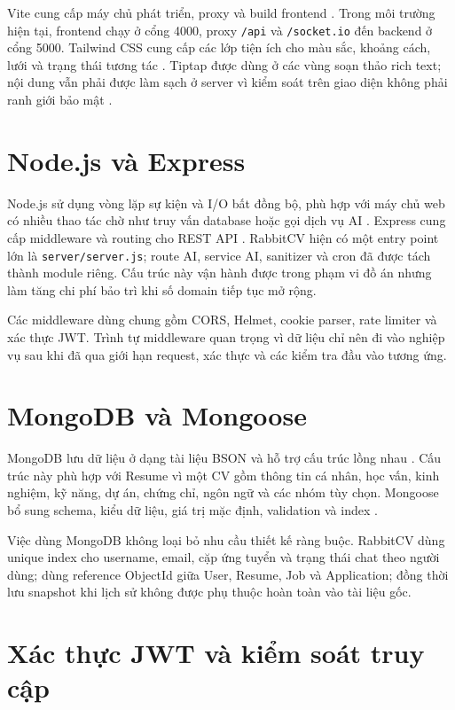 Vite cung cấp máy chủ phát triển, proxy và build frontend \cite{vitedocs}. Trong môi trường hiện tại, frontend chạy ở cổng 4000, proxy \texttt{/api} và \texttt{/socket.io} đến backend ở cổng 5000. Tailwind CSS cung cấp các lớp tiện ích cho màu sắc, khoảng cách, lưới và trạng thái tương tác \cite{tailwinddocs}. Tiptap được dùng ở các vùng soạn thảo rich text; nội dung vẫn phải được làm sạch ở server vì kiểm soát trên giao diện không phải ranh giới bảo mật \cite{tiptapdocs}.

\section{Node.js và Express}

Node.js sử dụng vòng lặp sự kiện và I/O bất đồng bộ, phù hợp với máy chủ web có nhiều thao tác chờ như truy vấn database hoặc gọi dịch vụ AI \cite{nodedocs}. Express cung cấp middleware và routing cho REST API \cite{expressdocs}. RabbitCV hiện có một entry point lớn là \texttt{server/server.js}; route AI, service AI, sanitizer và cron đã được tách thành module riêng. Cấu trúc này vận hành được trong phạm vi đồ án nhưng làm tăng chi phí bảo trì khi số domain tiếp tục mở rộng.

Các middleware dùng chung gồm CORS, Helmet, cookie parser, rate limiter và xác thực JWT. Trình tự middleware quan trọng vì dữ liệu chỉ nên đi vào nghiệp vụ sau khi đã qua giới hạn request, xác thực và các kiểm tra đầu vào tương ứng.

\section{MongoDB và Mongoose}

MongoDB lưu dữ liệu ở dạng tài liệu BSON và hỗ trợ cấu trúc lồng nhau \cite{mongodbdocs}. Cấu trúc này phù hợp với Resume vì một CV gồm thông tin cá nhân, học vấn, kinh nghiệm, kỹ năng, dự án, chứng chỉ, ngôn ngữ và các nhóm tùy chọn. Mongoose bổ sung schema, kiểu dữ liệu, giá trị mặc định, validation và index \cite{mongooseDocs}.

Việc dùng MongoDB không loại bỏ nhu cầu thiết kế ràng buộc. RabbitCV dùng unique index cho username, email, cặp ứng tuyển và trạng thái chat theo người dùng; dùng reference ObjectId giữa User, Resume, Job và Application; đồng thời lưu snapshot khi lịch sử không được phụ thuộc hoàn toàn vào tài liệu gốc.

\section{Xác thực JWT và kiểm soát truy cập}

